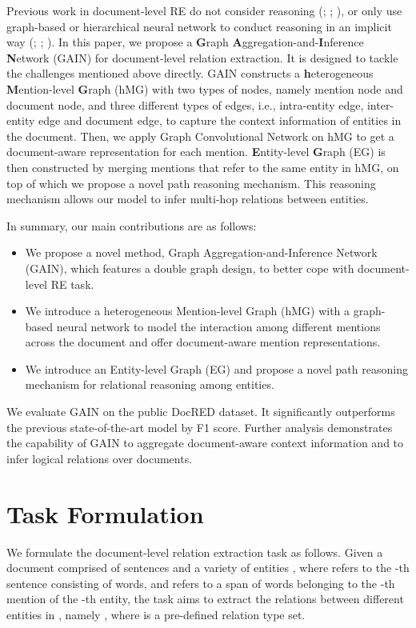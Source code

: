 \documentclass[11pt,a4paper]{article}
\begin{document}
Previous work in document-level RE do not consider reasoning (\citealp{DBLP:conf/aaai/GuptaRSR19}; \citealp{jia-etal-19-document}; \citealp{yao-etal-19-docred}), or only use graph-based or hierarchical neural network to conduct reasoning in an implicit way (\citealp{peng-etal-17-cross}; \citealp{sahu-etal-19-inter}; \citealp{LSR}).
In this paper, we propose a \textbf{G}raph \textbf{A}ggregation-and-\textbf{I}nference \textbf{N}etwork (GAIN) for document-level relation extraction. 
It is designed to tackle the challenges mentioned above directly.
GAIN constructs a \textbf{h}eterogeneous \textbf{M}ention-level \textbf{G}raph (hMG) with two types of nodes, namely mention node and document node, and three different types of edges, i.e., intra-entity edge, inter-entity edge and document edge, to capture the context information of entities in the document.
Then, we apply Graph Convolutional Network \citep{kipf2017semi} on hMG to get a document-aware representation for each mention. 
\textbf{E}ntity-level \textbf{G}raph (EG) is then constructed by merging mentions that refer to the same entity in hMG, on top of which we propose a novel path reasoning mechanism. This reasoning mechanism allows our model to infer multi-hop relations between entities.

In summary, our main contributions are as follows:
\begin{itemize}
    \item We propose a novel method, Graph Aggregation-and-Inference Network (GAIN), which features a double graph design, to better cope with document-level RE task.
    
    \item We introduce a heterogeneous Mention-level Graph (hMG) with a graph-based neural network to model the interaction among different mentions across the document and offer document-aware mention representations.
    
    \item We introduce an Entity-level Graph (EG) and propose a novel path reasoning mechanism for relational reasoning among entities.
\end{itemize}

We evaluate GAIN on the public DocRED dataset. It significantly outperforms the previous state-of-the-art model by  F1 score. 
Further analysis demonstrates the capability of GAIN to aggregate document-aware context information and to infer logical relations over documents. 
 \section{Task Formulation}
We formulate the document-level relation extraction task as follows. Given a document comprised of  sentences  and a variety of entities , where  refers to the -th sentence consisting of  words,  and  refers to a span of words belonging to the -th mention of the -th entity, the task aims to extract the relations between different entities in , namely , where  is a pre-defined relation type set.
\end{document}
